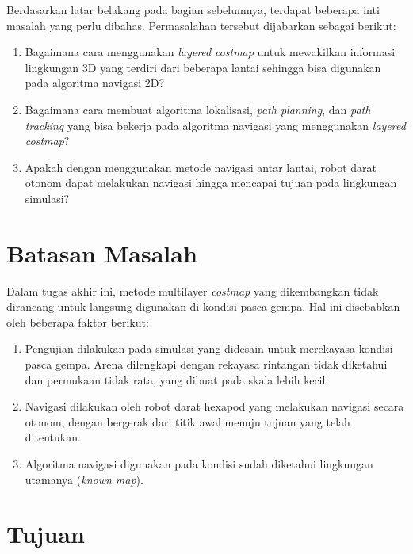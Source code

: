 Berdasarkan latar belakang pada bagian sebelumnya, terdapat beberapa inti masalah yang perlu dibahas. Permasalahan tersebut dijabarkan sebagai berikut:
\begin{enumerate}
  \item Bagaimana cara menggunakan \emph{layered} \emph{costmap} untuk mewakilkan informasi lingkungan 3D yang terdiri dari beberapa lantai sehingga bisa digunakan pada algoritma navigasi 2D?
  \item Bagaimana cara membuat algoritma lokalisasi, \emph{path planning}, dan \emph{path tracking} yang bisa bekerja pada algoritma navigasi yang menggunakan \emph{layered} \emph{costmap}?
  \item Apakah dengan menggunakan metode navigasi antar lantai, robot darat otonom dapat melakukan navigasi hingga mencapai tujuan pada lingkungan simulasi?
\end{enumerate}

\section{Batasan Masalah}
\label{sec:batasanmasalah}

Dalam tugas akhir ini, metode multilayer \emph{costmap} yang dikembangkan tidak dirancang untuk langsung digunakan di kondisi pasca gempa. Hal ini disebabkan oleh beberapa faktor berikut:
\begin{enumerate}
  \item Pengujian dilakukan pada simulasi yang didesain untuk merekayasa kondisi pasca gempa. Arena dilengkapi dengan rekayasa rintangan tidak diketahui dan permukaan tidak rata, yang dibuat pada skala lebih kecil. 
  \item Navigasi dilakukan oleh robot darat hexapod yang melakukan navigasi secara otonom, dengan bergerak dari titik awal menuju tujuan yang telah ditentukan. 
  \item Algoritma navigasi digunakan pada kondisi sudah diketahui lingkungan utamanya (\emph{known map}).
\end{enumerate}


\section{Tujuan}
\label{sec:Tujuan}


